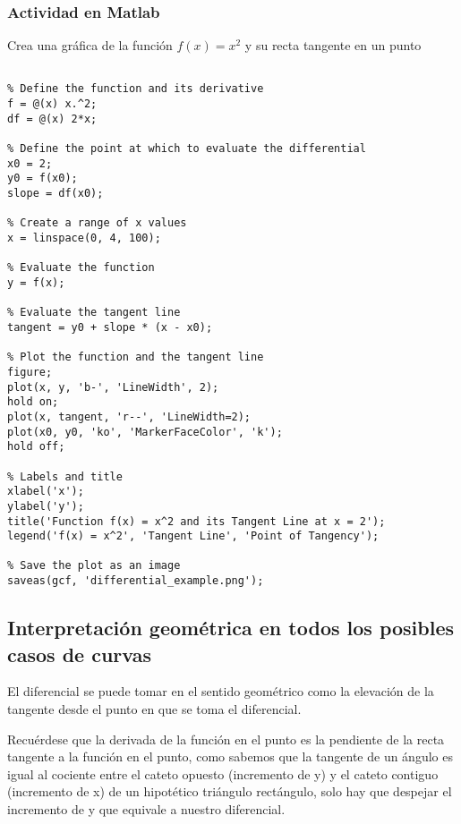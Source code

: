 \subsubsection{Actividad en Matlab}
Crea una gráfica de la función $f(x) = x^2$ y su recta tangente en un punto
\begin{lstlisting}[style=Matlab-editor]
% differential_example.m

% Define the function and its derivative
f = @(x) x.^2;
df = @(x) 2*x;

% Define the point at which to evaluate the differential
x0 = 2;
y0 = f(x0);
slope = df(x0);

% Create a range of x values
x = linspace(0, 4, 100);

% Evaluate the function
y = f(x);

% Evaluate the tangent line
tangent = y0 + slope * (x - x0);

% Plot the function and the tangent line
figure;
plot(x, y, 'b-', 'LineWidth', 2);
hold on;
plot(x, tangent, 'r--', 'LineWidth=2);
plot(x0, y0, 'ko', 'MarkerFaceColor', 'k');
hold off;

% Labels and title
xlabel('x');
ylabel('y');
title('Function f(x) = x^2 and its Tangent Line at x = 2');
legend('f(x) = x^2', 'Tangent Line', 'Point of Tangency');

% Save the plot as an image
saveas(gcf, 'differential_example.png');
\end{lstlisting}
\newpage
\subsection{Interpretación geométrica en todos los posibles casos de curvas}
El diferencial se puede tomar en el sentido geométrico como la elevación de la tangente desde el punto en que se toma el diferencial.

Recuérdese que la derivada de la función en el punto es la pendiente de la recta tangente a la función en el punto, como sabemos que la tangente de un ángulo es igual al cociente entre el cateto opuesto (incremento de y) y el cateto contiguo (incremento de x) de un hipotético triángulo rectángulo, solo hay que despejar el incremento de y que equivale a nuestro diferencial.

